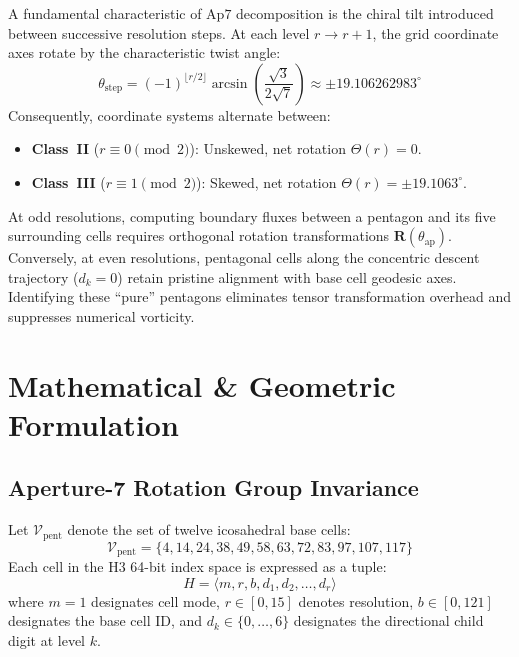 \documentclass[10pt,journal,compsoc]{IEEEtran}
\begin{document}
A fundamental characteristic of $\mathrm{Ap}7$ decomposition is the chiral tilt introduced between successive resolution steps. At each level $r \to r+1$, the grid coordinate axes rotate by the characteristic twist angle:
\begin{equation}
\theta_{\mathrm{step}} = (-1)^{\lfloor r/2 \rfloor} \arcsin\left(\frac{\sqrt{3}}{2\sqrt{7}}\right) \approx \pm 19.106262983^{\circ}
\end{equation}
Consequently, coordinate systems alternate between:
\begin{itemize}
    \item \textbf{Class~II} ($r \equiv 0 \pmod 2$): Unskewed, net rotation $\Theta(r) = 0$.
    \item \textbf{Class~III} ($r \equiv 1 \pmod 2$): Skewed, net rotation $\Theta(r) = \pm 19.1063^{\circ}$.
\end{itemize}

At odd resolutions, computing boundary fluxes between a pentagon and its five surrounding cells requires orthogonal rotation transformations $\mathbf{R}(\theta_{\mathrm{ap}})$. Conversely, at even resolutions, pentagonal cells along the concentric descent trajectory ($d_k = 0$) retain pristine alignment with base cell geodesic axes. Identifying these ``pure'' pentagons eliminates tensor transformation overhead and suppresses numerical vorticity.

\section{Mathematical \& Geometric Formulation}

\subsection{Aperture-7 Rotation Group Invariance}
Let $\mathcal{V}_{\text{pent}}$ denote the set of twelve icosahedral base cells:
\begin{equation}
\mathcal{V}_{\text{pent}} = \{4, 14, 24, 38, 49, 58, 63, 72, 83, 97, 107, 117\}
\end{equation}
Each cell in the H3 64-bit index space is expressed as a tuple:
\begin{equation}
H = \langle m, r, b, d_1, d_2, \dots, d_r \rangle
\end{equation}
where $m=1$ designates cell mode, $r \in [0, 15]$ denotes resolution, $b \in [0, 121]$ designates the base cell ID, and $d_k \in \{0, \dots, 6\}$ designates the directional child digit at level $k$.
\end{document}

